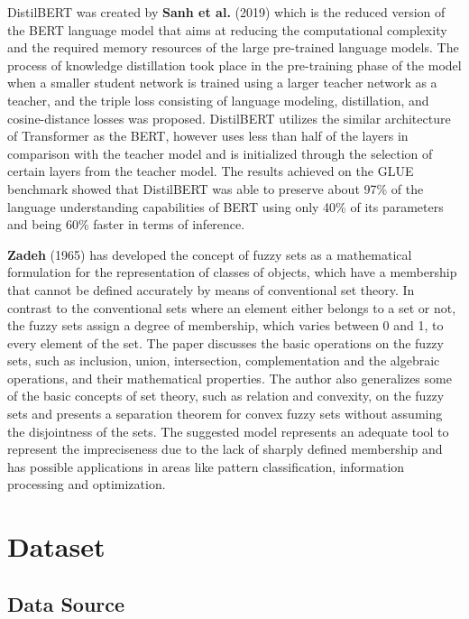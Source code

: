 \documentclass[conference]{IEEEtran}
\begin{document}
DistilBERT was created by \textbf{Sanh et al.} (2019) which is the reduced version of the BERT language model that aims at reducing the computational complexity and the required memory resources of the large pre-trained language models. The process of knowledge distillation took place in the pre-training phase of the model when a smaller student network is trained using a larger teacher network as a teacher, and the triple loss consisting of language modeling, distillation, and cosine-distance losses was proposed. DistilBERT utilizes the similar architecture of Transformer as the BERT, however uses less than half of the layers in comparison with the teacher model and is initialized through the selection of certain layers from the teacher model. The results achieved on the GLUE benchmark showed that DistilBERT was able to preserve about 97\% of the language understanding capabilities of BERT using only 40\% of its parameters and being 60\% faster in terms of inference.

\textbf{Zadeh} (1965) has developed the concept of fuzzy sets as a mathematical formulation for the representation of classes of objects, which have a membership that cannot be defined accurately by means of conventional set theory. In contrast to the conventional sets where an element either belongs to a set or not, the fuzzy sets assign a degree of membership, which varies between 0 and 1, to every element of the set. The paper discusses the basic operations on the fuzzy sets, such as inclusion, union, intersection, complementation and the algebraic operations, and their mathematical properties. The author also generalizes some of the basic concepts of set theory, such as relation and convexity, on the fuzzy sets and presents a separation theorem for convex fuzzy sets without assuming the disjointness of the sets. The suggested model represents an adequate tool to represent the impreciseness due to the lack of sharply defined membership and has possible applications in areas like pattern classification, information processing and optimization.



\section{Dataset}


\subsection{\textbf{Data Source}}
\end{document}
